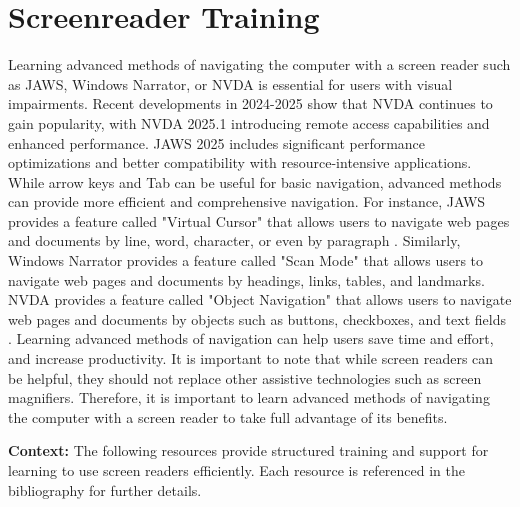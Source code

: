 \hypertarget{appx7}{}\section[Screenreader Training]{Screenreader Training}\label{appx7}
Learning advanced methods of navigating the computer with a screen reader such as JAWS, Windows Narrator, or NVDA is essential for users with visual impairments. Recent developments in 2024-2025 show that NVDA continues to gain popularity, with NVDA 2025.1 introducing remote access capabilities and enhanced performance. JAWS 2025 includes significant performance optimizations and better compatibility with resource-intensive applications. While arrow keys and Tab can be useful for basic navigation, advanced methods can provide more efficient and comprehensive navigation. For instance, JAWS provides a feature called "Virtual Cursor" that allows users to navigate web pages and documents by line, word, character, or even by paragraph \cite{JAWSFS}. Similarly, Windows Narrator provides a feature called "Scan Mode" that allows users to navigate web pages and documents by headings, links, tables, and landmarks. \cite{MSNarratorGuide,MSWin11ScreenReader} NVDA provides a feature called "Object Navigation" that allows users to navigate web pages and documents by objects such as buttons, checkboxes, and text fields \cite{NVDAGuide}. Learning advanced methods of navigation can help users save time and effort, and increase productivity. It is important to note that while screen readers can be helpful, they should not replace other assistive technologies such as screen magnifiers. Therefore, it is important to learn advanced methods of navigating the computer with a screen reader to take full advantage of its benefits.

\noindent
\textbf{Context:} The following resources provide structured training and support for learning to use screen readers efficiently. Each resource is referenced in the bibliography for further details.

